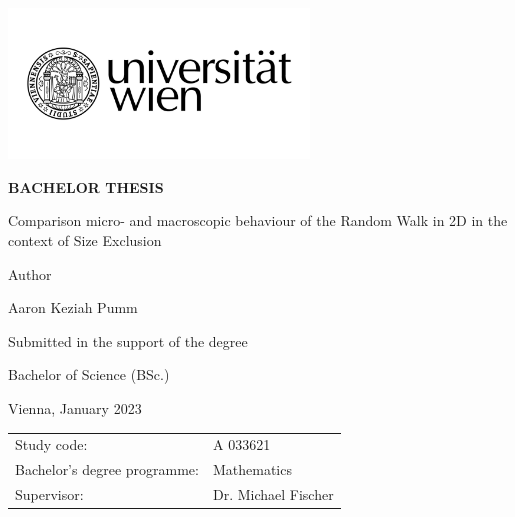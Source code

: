 \begin{titlepage}
\begin{flushright}
    \includegraphics[width=8cm]{Uni_Logo_2016_SW}
\end{flushright}

\begin{center}  %
    \Huge{\textbf{\textsf{\MakeUppercase{
         Bachelor Thesis
    }}}}
    \vspace{2cm}

    \large{\textsf{  %
    }}
    \vspace{.1cm}

    \LARGE{\textsf{  Comparison micro- and macroscopic behaviour of the Random Walk in 2D in the context of Size Exclusion
    }}
    \vspace{3cm}

    \large{\textsf{  %
        Author
    }}

    \Large{\textsf{  Aaron Keziah Pumm
    }}
    \vspace{3cm}

    \large{\textsf{
        Submitted in the support of the degree  %
    }}

    \Large{\textsf{  %
        Bachelor of Science (BSc.)
    }}
\end{center}
\vspace{2cm}

\noindent\textsf{Vienna, January 2023}  %
\vfill

\noindent\begin{tabular}{@{}ll}
\textsf{Study code:}
&
\textsf{A 033621}  %
\\
\textsf{Bachelor's degree programme:}
&
\textsf{Mathematics}  %
\\
\textsf{Supervisor:}
&
\textsf{Dr. Michael Fischer}  %
\end{tabular}

\end{titlepage}
